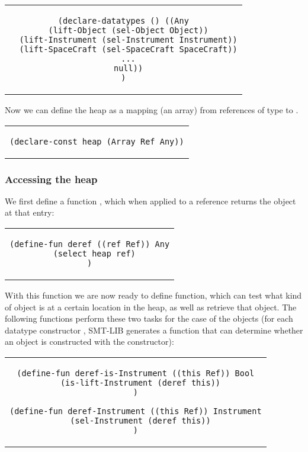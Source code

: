 \begin{center}
\begin{tabular}{c}
\begin{lstlisting}
(declare-datatypes () ((Any
  (lift-Object (sel-Object Object))
  (lift-Instrument (sel-Instrument Instrument))
  (lift-SpaceCraft (sel-SpaceCraft SpaceCraft))
  ...
  null))
)
\end{lstlisting}
\end{tabular}
\end{center}

Now we can define the heap as a mapping (an array) from
references of type  to . 

\begin{center}
\begin{tabular}{c}
\begin{lstlisting}
(declare-const heap (Array Ref Any))
\end{lstlisting}
\end{tabular}
\end{center}

\subsubsection{Accessing the heap}

We first define a function , which when applied to a reference returns the  object at that entry:

\begin{center}
\begin{tabular}{c}
\begin{lstlisting}
(define-fun deref ((ref Ref)) Any
  (select heap ref)
)
\end{lstlisting}
\end{tabular}
\end{center}

With this function we are now ready to define function, which
can test what kind of object is at a certain location in the heap,
as well as retrieve that object. The following functions perform
these two tasks for the case of the  objects
(for each datatype constructor , SMT-LIB generates
a  function that can determine whether an object is
constructed with the constructor):

\begin{center}
\begin{tabular}{c}
\begin{lstlisting}
(define-fun deref-is-Instrument ((this Ref)) Bool
  (is-lift-Instrument (deref this))
)

(define-fun deref-Instrument ((this Ref)) Instrument
  (sel-Instrument (deref this))
)
\end{lstlisting}
\end{tabular}
\end{center}

